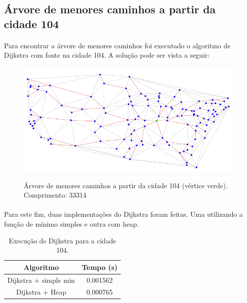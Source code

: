 \documentclass[11pt,a4paper]{article}
\begin{document}
        \subsection{Árvore de menores caminhos a partir da cidade 104}

        \paragraph{}
        Para encontrar a árvore de menores caminhos foi executado o algoritmo de Dijkstra com fonte na cidade 104. A solução pode ser vista a seguir:

        \begin{figure}[htb!]
          \centering
              \captionsetup{justification=centering}  
              \includegraphics[scale=0.5]{map104}
              \label{fig:map104}
              \caption{Árvore de menores caminhos a partir da cidade 104 (vértice verde). Comprimento: 33314}
        \end{figure}

        \paragraph{}
        Para este fim, duas implementações do Dijkstra foram feitas. Uma utilizando a função de mínimo simples e outra com heap.

        \begin{table}[htb!]
        \centering
            \begin{tabular}{|c|c|}
            \toprule
            Algoritmo                         & Tempo (s)\\
            \midrule
            Dijkstra + simple min             & 0.001562 \\
            Dijkstra + Heap                   & 0.000765 \\
            \bottomrule
            \end{tabular}
            \caption {Execução de Dijkstra para a cidade 104.}
        \end{table}
\end{document}
